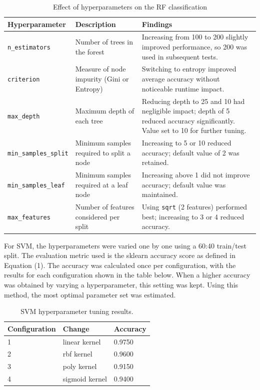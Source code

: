 \documentclass[a4paper,11pt]{scrartcl}
\begin{document}
\begin{table}[H]
\centering
\begin{tabular}{|l|p{4cm}|p{7cm}|}
\hline
\textbf{Hyperparameter} & \textbf{Description} & \textbf{Findings} \\
\hline
\texttt{n\_estimators} & Number of trees in the forest & Increasing from 100 to 200 slightly improved performance, so 200 was used in subsequent tests. \\
\hline
\texttt{criterion}  & Measure of node impurity (Gini or Entropy) & Switching to entropy improved average accuracy without noticeable runtime impact. \\
\hline
\texttt{max\_depth}  & Maximum depth of each tree & Reducing depth to 25 and 10 had negligible impact; depth of 5 reduced accuracy significantly. Value set to 10 for further tuning. \\
\hline
\texttt{min\_samples\_split} & Minimum samples required to split a node & Increasing to 5 or 10 reduced accuracy; default value of 2 was retained. \\
\hline
\texttt{min\_samples\_leaf} & Minimum samples required at a leaf node & Increasing above 1 did not improve accuracy; default value was maintained. \\
\hline
\texttt{max\_features} & Number of features considered per split & Using \texttt{sqrt} (2 features) performed best; increasing to 3 or 4 reduced accuracy. \\
\hline
\end{tabular}
\caption{Effect of hyperparameters on the RF classification}
\label{tab:RF_hyperparameters_overview}
\end{table}

For SVM, the hyperparameters were varied one by one using a 60:40 train/test split. The evaluation metric used is the sklearn accuracy score as defined in Equation (1). The accuracy was calculated once per configuration, with the results for each configuration shown in the table below. When a higher accuracy was obtained by varying a hyperparameter, this setting was kept. Using this method, the most optimal parameter set was estimated.
\begin{table}[h]
\centering
\begin{tabular}{lll}
\hline
Configuration & Change & Accuracy \\
\hline
1 & linear kernel & 0.9750 \\
2 & rbf kernel & 0.9600 \\
3 & poly kernel & 0.9150 \\
4 & sigmoid kernel & 0.9400 \\
\hline
\end{tabular}
\caption{SVM hyperparameter tuning results.}
\label{tab:SVM_hyperparameters_results}
\end{table}
\end{document}
